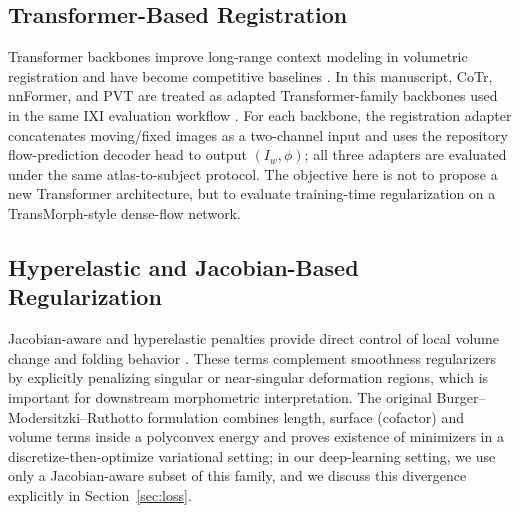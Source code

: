 \documentclass[jimaging,article,submit,pdftex,moreauthors]{Definitions/mdpi}
\begin{document}
\subsection{Transformer-Based Registration}
Transformer backbones improve long-range context modeling in volumetric registration and have become competitive baselines \cite{chen2022transmorph,liu2021swin}. In this manuscript, CoTr, nnFormer, and PVT are treated as adapted Transformer-family backbones used in the same IXI evaluation workflow \cite{xie2021cotr,zhou2023nnformer,wang2021pvt}. For each backbone, the registration adapter concatenates moving/fixed images as a two-channel input and uses the repository flow-prediction decoder head to output \((I_w,\phi)\); all three adapters are evaluated under the same atlas-to-subject protocol. The objective here is not to propose a new Transformer architecture, but to evaluate training-time regularization on a TransMorph-style dense-flow network.

\subsection{Hyperelastic and Jacobian-Based Regularization}
Jacobian-aware and hyperelastic penalties provide direct control of local volume change and folding behavior \cite{burger2013hyperelastic}. These terms complement smoothness regularizers by explicitly penalizing singular or near-singular deformation regions, which is important for downstream morphometric interpretation. The original Burger--Modersitzki--Ruthotto formulation combines length, surface (cofactor) and volume terms inside a polyconvex energy and proves existence of minimizers in a discretize-then-optimize variational setting; in our deep-learning setting, we use only a Jacobian-aware subset of this family, and we discuss this divergence explicitly in Section~\ref{sec:loss}.
\end{document}
